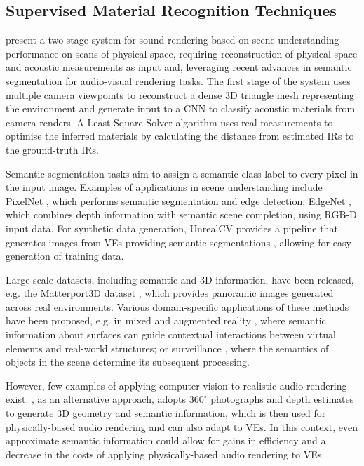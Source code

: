 \subsection{Supervised Material Recognition Techniques}
\cite{schissler2017acoustic} present a two-stage system for sound rendering based on scene understanding performance on scans of physical space, requiring reconstruction of physical space and acoustic measurements as input and, leveraging recent advances in semantic segmentation for audio-visual rendering tasks. The first stage of the system uses multiple camera viewpoints to reconstruct a dense 3D triangle mesh representing the environment and generate input to a CNN to classify acoustic materials from camera renders. A Least Square Solver algorithm uses real measurements to optimise the inferred materials by calculating the distance from estimated IRs to the ground-truth IRs.\par
Semantic segmentation tasks aim to assign a semantic class label to every pixel in the input image. Examples of applications in scene understanding include PixelNet \citep{bansal2016pixelnet}, which performs semantic segmentation and edge detection; EdgeNet \citep{dourado2019edgenet}, which combines depth information with semantic scene completion, using RGB-D input data. For synthetic data generation, UnrealCV provides a pipeline that generates images from VEs providing semantic segmentations \citep{qiu2016unrealcv}, allowing for easy generation of training data.\par
Large-scale datasets, including semantic and 3D information, have been released, e.g. the Matterport3D dataset \citep{chang2017matterport3d}, which provides panoramic images generated across real environments. Various domain-specific applications of these methods have been proposed, e.g. in mixed and augmented reality \citep{chen2018context}, where semantic information about surfaces can guide contextual interactions between virtual elements and real-world structures; or surveillance \citep{mao2018aic2018}, where the semantics of objects in the scene determine its subsequent processing.\par
However, few examples of applying computer vision to realistic audio rendering exist. \cite{kim2019immersive}, as an alternative approach, adopts $360^{\circ}$ photographs and depth estimates to generate 3D geometry and semantic information, which is then used for physically-based audio rendering and can also adapt to VEs. In this context, even approximate semantic information could allow for gains in efficiency and a decrease in the costs of applying physically-based audio rendering to VEs.\par
